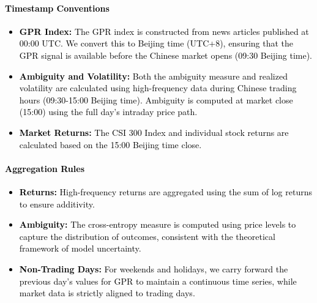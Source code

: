 \documentclass[preprint,12pt,authoryear]{elsarticle}
\begin{document}
\paragraph{\textcolor{black}{Timestamp Conventions}}
\textcolor{black}{\begin{itemize}
    \item \textbf{GPR Index:} The GPR index is constructed from news articles published at 00:00 UTC. We convert this to Beijing time (UTC+8), ensuring that the GPR signal is available before the Chinese market opens (09:30 Beijing time).
    \item \textbf{Ambiguity and Volatility:} Both the ambiguity measure and realized volatility are calculated using high-frequency data during Chinese trading hours (09:30-15:00 Beijing time). Ambiguity is computed at market close (15:00) using the full day's intraday price path.
    \item \textbf{Market Returns:} The CSI 300 Index and individual stock returns are calculated based on the 15:00 Beijing time close.
\end{itemize}}

\paragraph{\textcolor{black}{Aggregation Rules}}
\textcolor{black}{\begin{itemize}
    \item \textbf{Returns:} High-frequency returns are aggregated using the sum of log returns to ensure additivity.
    \item \textbf{Ambiguity:} The cross-entropy measure is computed using price levels to capture the distribution of outcomes, consistent with the theoretical framework of model uncertainty.
    \item \textbf{Non-Trading Days:} For weekends and holidays, we carry forward the previous day's values for GPR to maintain a continuous time series, while market data is strictly aligned to trading days.
\end{itemize}}
\end{document}

